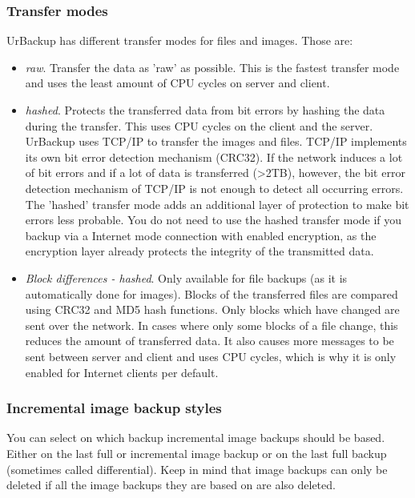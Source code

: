 \documentclass[a4paper,10pt]{article}
\begin{document}
\subsubsection{Transfer modes}

UrBackup has different transfer modes for files and images. Those are:

\begin{itemize}
  \item \textsl{raw}. Transfer the data as 'raw' as possible. This is the fastest transfer
  		mode and uses the least amount of CPU cycles on server and client.
  \item \textsl{hashed}. Protects the transferred data from bit errors by hashing the data
  		during the transfer. This uses CPU cycles on the client and the server.\\
  		UrBackup uses TCP/IP to transfer the images and files. TCP/IP implements its own
  		bit error detection mechanism (CRC32). If the network induces a lot of bit errors
  		and if a lot of data is transferred (>2TB), however, the bit error detection mechanism
  		of TCP/IP is not enough to detect all occurring errors. The 'hashed' transfer mode
  		adds an additional layer of protection to make bit errors less probable.
  		You do not need to use the hashed transfer mode if you backup via a Internet mode
  		connection with enabled encryption, as the encryption layer already protects the integrity
  		of the transmitted data.
  \item \textsl{Block differences - hashed}. Only available for file backups (as it is
  		automatically done for images). Blocks of the transferred files are compared using
  		CRC32 and MD5 hash functions. Only blocks which have changed are sent over the
  		network. In cases where only some blocks of a file change, this reduces the amount
  		of transferred data. It also causes more messages to be sent between server and
  		client and uses CPU cycles, which is why it is only enabled for Internet clients
  		per default. 
\end{itemize}

\subsubsection{Incremental image backup styles}

You can select on which backup incremental image backups should be based. Either on the last full or incremental image backup or on the last full backup (sometimes called differential).
Keep in mind that image backups can only be deleted if all the image backups they are based on are also deleted.
\end{document}
